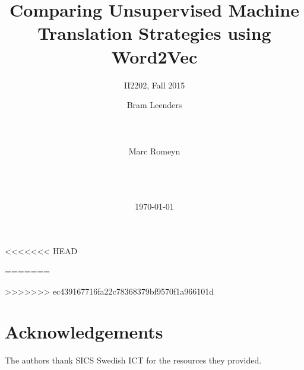 \documentclass{acm_proc_article-sp}
\begin{document}
\title{Comparing Unsupervised Machine Translation Strategies using Word2Vec}
\subtitle{II2202, Fall 2015}


\author{
%
%
\alignauthor
Bram Leenders\\
       \\
       \\
       \\
\alignauthor
Marc Romeyn\\
       \\
       \\
       \\
}

\date{\today}

\maketitle



<<<<<<< HEAD

=======

>>>>>>> ec439167716fa22c78368379bf9570f1a966101d







\section*{Acknowledgements}
The authors thank SICS Swedish ICT for the resources they provided.




\balancecolumns
\end{document}
